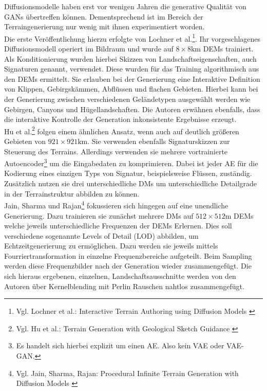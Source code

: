 Diffusionsmodelle haben erst vor wenigen Jahren die generative Qualität von GANs übertreffen können. Dementsprechend ist im Bereich der Terraingenerierung nur wenig mit ihnen experimentiert worden. \\
Die erste Veröffentlichung hierzu erfolgte von Lochner et al.\footnote{
    Vgl. Lochner et al.: Interactive Terrain Authoring using Diffusion Models
    \cite{lochner2023interactive}
}. Ihr vorgeschlagenes Diffusionsmodell operiert im Bildraum und wurde auf $8\times8\text{km}$ DEMs trainiert. Als Konditionierung wurden hierbei Skizzen von Landschaftseigenschaften, auch Signaturen genannt, verwendet. Diese wurden für das Training algorithmisch aus den DEMs ermittelt. Sie erlauben bei der Generierung eine Interaktive Definition von Klippen, Gebirgskämmen, Abflüssen und flachen Gebieten. Hierbei kann bei der Generierung zwischen verschiedenen Geländetypen ausgewählt werden wie Gebirgen, Canyons und Hügellandschaften. Die Autoren erwähnen ebenfalls, dass die interaktive Kontrolle der Generation inkonsistente Ergebnisse erzeugt.\\
Hu et al.\footnote{
    Vgl. Hu et al.: Terrain Generation with Geological Sketch Guidance
    \cite{hu2024terrain}
} folgen einem ähnlichen Ansatz, wenn auch auf deutlich größeren Gebieten von $921\times921\text{km}$. Sie verwenden ebenfalls Signaturskizzen zur Steuerung des Terrains. Allerdings verwenden sie mehrere vortrainierte Autoencoder\footnote{
    Es handelt sich hierbei explizit um einen AE. Also kein VAE oder VAE-GAN.
} um die Eingabedaten zu komprimieren. Dabei ist jeder AE für die Kodierung eines einzigen Typs von Signatur, beispielsweise Flüssen, zuständig. Zusätzlich nutzen sie drei unterschiedliche DMs um unterschiedliche Detailgrade in der Terrainstruktur abbilden zu können. \\
Jain, Sharma und Rajan\footnote{
    Vgl. Jain, Sharma, Rajan: Procedural Infinite Terrain Generation with Diffusion Models
    \cite{jain2022adaptive}
} fokussieren sich hingegen auf eine unendliche Generierung. Dazu trainieren sie zunächst mehrere DMs auf $512\times512\text{m}$ DEMs welche jeweils unterschiedliche Frequenzen der DEMs Erlernen. Dies soll verschiedene sogenannte Levels of Detail (LOD) abbilden, um Echtzeitgenerierung zu ermöglichen. Dazu werden sie jeweils mittels Fourriertransformation in einzelne Frequenzbereiche aufgeteilt. Beim Sampling werden diese Frequenzbilder nach der Generation wieder zusammengefügt. Die sich hieraus ergebenen, einzelnen, Landschaftsausschnitte werden von den Autoren über Kernelblending mit Perlin Rauschen nahtlos zusammengefügt. 




